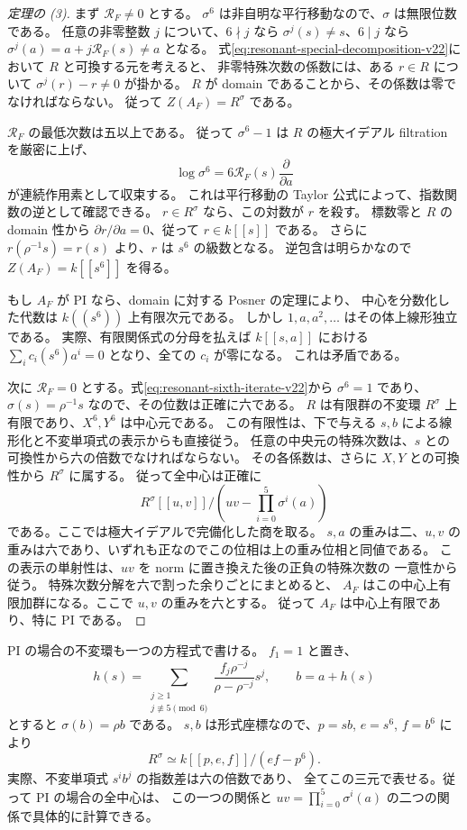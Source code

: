 \begin{proof}[定理の (3)]
まず $\mathcal R_F\ne0$ とする。
$\sigma^6$ は非自明な平行移動なので、$\sigma$ は無限位数である。
任意の非零整数 $j$ について、$6\nmid j$ なら
$\sigma^j(s)\ne s$、$6\mid j$ なら
$\sigma^j(a)=a+j\mathcal R_F(s)\ne a$ となる。
式\eqref{eq:resonant-special-decomposition-v22}において $R$ と可換する元を考えると、
非零特殊次数の係数には、ある $r\in R$ について
$\sigma^j(r)-r\ne0$ が掛かる。
$R$ が domain であることから、その係数は零でなければならない。
従って $Z(A_F)=R^\sigma$ である。

$\mathcal R_F$ の最低次数は五以上である。
従って $\sigma^6-1$ は $R$ の極大イデアル filtration を厳密に上げ、
\[
 \log\sigma^6=6\mathcal R_F(s)\frac\partial{\partial a}
\]
が連続作用素として収束する。
これは平行移動の Taylor 公式によって、指数関数の逆として確認できる。
$r\in R^\sigma$ なら、この対数が $r$ を殺す。
標数零と $R$ の domain 性から $\partial r/\partial a=0$、従って $r\in k[[s]]$ である。
さらに $r(\rho^{-1}s)=r(s)$ より、$r$ は $s^6$ の級数となる。
逆包含は明らかなので $Z(A_F)=k[[s^6]]$ を得る。

もし $A_F$ が PI なら、domain に対する Posner の定理\cite[Theorem 4.1]{BresarPosnerV18}により、
中心を分数化した代数は $k((s^6))$ 上有限次元である。
しかし $1,a,a^2,\ldots$ はその体上線形独立である。
実際、有限関係式の分母を払えば $k[[s,a]]$ における
$\sum_i c_i(s^6)a^i=0$ となり、全ての $c_i$ が零になる。
これは矛盾である。

次に $\mathcal R_F=0$ とする。式\eqref{eq:resonant-sixth-iterate-v22}から
$\sigma^6=1$ であり、$\sigma(s)=\rho^{-1}s$ なので、その位数は正確に六である。
$R$ は有限群の不変環 $R^\sigma$ 上有限であり、$X^6,Y^6$ は中心元である。
この有限性は、下で与える $s,b$ による線形化と不変単項式の表示からも直接従う。
任意の中央元の特殊次数は、$s$ との可換性から六の倍数でなければならない。
その各係数は、さらに $X,Y$ との可換性から $R^\sigma$ に属する。
従って全中心は正確に
\[
 R^\sigma[[u,v]]/\left(uv-\prod_{i=0}^5\sigma^i(a)\right)
\]
である。ここでは極大イデアルで完備化した商を取る。
$s,a$ の重みは二、$u,v$ の重みは六であり、いずれも正なのでこの位相は上の重み位相と同値である。
この表示の単射性は、$uv$ を norm に置き換えた後の正負の特殊次数の
一意性から従う。
特殊次数分解を六で割った余りごとにまとめると、
$A_F$ はこの中心上有限加群になる。ここで $u,v$ の重みを六とする。
従って $A_F$ は中心上有限であり、特に PI である。
\end{proof}

PI の場合の不変環も一つの方程式で書ける。
$f_1=1$ と置き、
\[
 h(s)=\sum_{\substack{j\ge1\\j\not\equiv5\pmod6}}
       \frac{f_j\rho^{-j}}{\rho-\rho^{-j}}s^j,
 \qquad b=a+h(s)
\]
とすると $\sigma(b)=\rho b$ である。
$s,b$ は形式座標なので、$p=sb$, $e=s^6$, $f=b^6$ により
\[
 R^\sigma\simeq k[[p,e,f]]/(ef-p^6).
\]
実際、不変単項式 $s^i b^j$ の指数差は六の倍数であり、
全てこの三元で表せる。従って PI の場合の全中心は、
この一つの関係と $uv=\prod_{i=0}^5\sigma^i(a)$ の二つの関係で具体的に計算できる。

